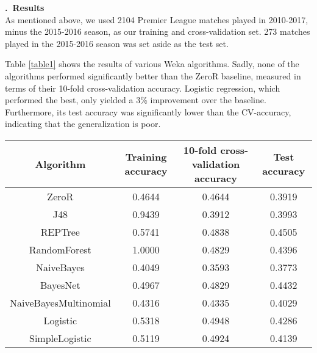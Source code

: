 \documentclass[a4paper,11pt,table]{article}
\renewcommand{\section}[1]{\stepcounter{section}\noindent\textbf{\arabic{section}.~#1}\\}
\begin{document}
\section{Results}
As mentioned above, we used 2104 Premier League matches played in 2010-2017, minus the 2015-2016 season, as our training and cross-validation set. 273 matches played in the 2015-2016 season was set aside as the test set.

Table \ref{table1} shows the results of various Weka algorithms. Sadly, none of the algorithms performed significantly better than the ZeroR baseline, measured in terms of their 10-fold cross-validation accuracy. Logistic regression, which performed the best, only yielded a 3\% improvement over the baseline. Furthermore, its test accuracy was significantly lower than the CV-accuracy, indicating that the generalization is poor.

\begin{center}
    \begin{tabular}{|c|c|c|c|}
        \hline
        Algorithm               &   Training accuracy  &   10-fold cross-validation accuracy  &   Test accuracy \\
        \hline
        ZeroR                   &   0.4644          &   0.4644      &   0.3919 \\
        \hline
        J48                     &   0.9439          &   0.3912      &   0.3993 \\
        \hline
        REPTree                 &   0.5741          &   0.4838      &   \cellcolor{red!25}0.4505 \\
        \hline
        RandomForest            &   \cellcolor{red!25}1.0000          &   0.4829      &   0.4396 \\
        \hline
        NaiveBayes              &   0.4049          &   0.3593      &   0.3773 \\
        \hline
        BayesNet                &   0.4967          &   0.4829      &   0.4432 \\
        \hline
        NaiveBayesMultinomial   &   0.4316          &   0.4335      &   0.4029 \\
        \hline
        Logistic                &   0.5318          &   \cellcolor{red!25}0.4948      &   0.4286 \\
        \hline
        SimpleLogistic          &   0.5119          &   0.4924      &   0.4139 \\
        \hline
    \end{tabular}
\end{center}
\end{document}

